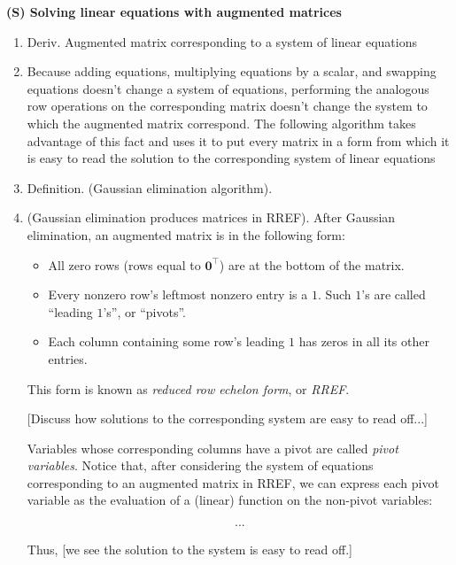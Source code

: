 \textbf{(S) Solving linear equations with augmented matrices}
\begin{enumerate}
    \item Deriv. Augmented matrix corresponding to a system of linear equations
    \item Because adding equations, multiplying equations by a scalar, and swapping equations doesn't change a system of equations, performing the analogous row operations on the corresponding matrix doesn't change the system to which the augmented matrix correspond. The following algorithm takes advantage of this fact and uses it to put every matrix in a form from which it is easy to read the solution to the corresponding system of linear equations
    \item Definition. (Gaussian elimination algorithm).
    \item (Gaussian elimination produces matrices in RREF). After Gaussian elimination, an augmented matrix is in the following form:
     \begin{itemize}
        \item All zero rows (rows equal to $\mathbf{0}^\top$) are at the bottom of the matrix.
        \item Every nonzero row's leftmost nonzero entry is a $1$. Such $1$'s are called ``leading $1$'s'', or ``pivots''.
        \item Each column containing some row's leading $1$ has zeros in all its other entries.
    \end{itemize}
        
    This form is known as \textit{reduced row echelon form}, or \textit{RREF}.

    [Discuss how solutions to the corresponding system are easy to read off...]

    Variables whose corresponding columns have a pivot are called \textit{pivot variables}. Notice that, after considering the system of equations corresponding to an augmented matrix in RREF, we can express each pivot variable as the evaluation of a (linear) function on the non-pivot variables:

    \begin{align*}
        ...
    \end{align*}

    Thus, [we see the solution to the system is easy to read off.]
    

\end{enumerate}
